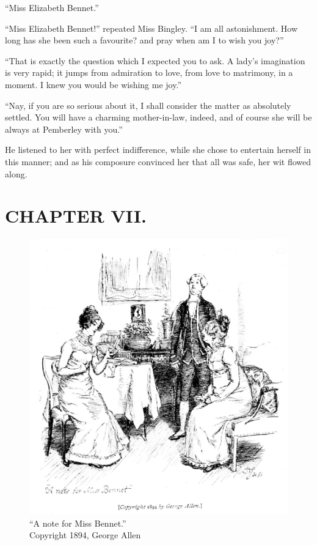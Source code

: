 ``Miss Elizabeth Bennet.''

``Miss Elizabeth Bennet!'' repeated Miss Bingley. ``I am all astonishment. How long has she been such a favourite? and pray when am I to wish you joy?''

``That is exactly the question which I expected you to ask. A lady's imagination is very rapid; it jumps from admiration to love, from love to matrimony, in a moment. I knew you would be wishing me joy.''

``Nay, if you are so serious about it, I shall consider the matter as absolutely settled. You will have a charming mother-in-law, indeed, and of course she will be always at Pemberley with you.''

He listened to her with perfect indifference, while she chose to entertain herself in this manner; and as his composure convinced her that all was safe, her wit flowed along.

\chapter{CHAPTER VII.}

\begin{figure}[htbp]
    \centering
    \includegraphics[width=\textwidth]{illustrations/i_065_a.jpg}
    \caption{“A note for Miss Bennet.”\\ Copyright 1894, George Allen}
    \label{fig:image}
\end{figure}


